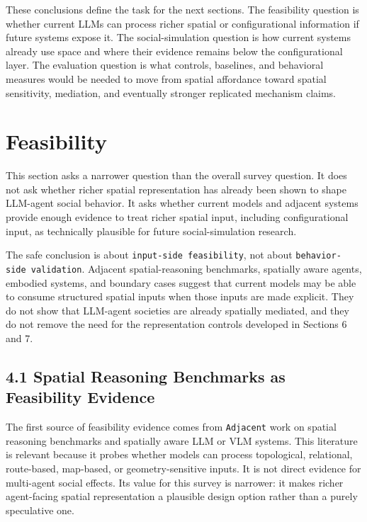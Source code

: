 \documentclass[
  twocolumn]{article}
\begin{document}
These conclusions define the task for the next sections. The feasibility
question is whether current LLMs can process richer spatial or
configurational information if future systems expose it. The
social-simulation question is how current systems already use space and
where their evidence remains below the configurational layer. The
evaluation question is what controls, baselines, and behavioral measures
would be needed to move from spatial affordance toward spatial
sensitivity, mediation, and eventually stronger replicated mechanism
claims.

\section{Feasibility}\label{feasibility}

This section asks a narrower question than the overall survey question.
It does not ask whether richer spatial representation has already been
shown to shape LLM-agent social behavior. It asks whether current models
and adjacent systems provide enough evidence to treat richer spatial
input, including configurational input, as technically plausible for
future social-simulation research.

The safe conclusion is about \texttt{input-side\ feasibility}, not about
\texttt{behavior-side\ validation}. Adjacent spatial-reasoning
benchmarks, spatially aware agents, embodied systems, and boundary cases
suggest that current models may be able to consume structured spatial
inputs when those inputs are made explicit. They do not show that
LLM-agent societies are already spatially mediated, and they do not
remove the need for the representation controls developed in Sections 6
and 7.

\subsection{4.1 Spatial Reasoning Benchmarks as Feasibility
Evidence}\label{spatial-reasoning-benchmarks-as-feasibility-evidence}

The first source of feasibility evidence comes from \texttt{Adjacent}
work on spatial reasoning benchmarks and spatially aware LLM or VLM
systems. This literature is relevant because it probes whether models
can process topological, relational, route-based, map-based, or
geometry-sensitive inputs. It is not direct evidence for multi-agent
social effects. Its value for this survey is narrower: it makes richer
agent-facing spatial representation a plausible design option rather
than a purely speculative one.
\end{document}
